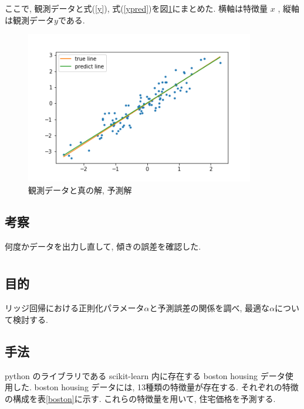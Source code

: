 \documentclass{jsarticle}
\begin{document}
ここで, 観測データと式(\ref{y}), 式(\ref{ypred})を図\ref{kaku}にまとめた. 横軸は特徴量 $x$ , 縦軸は観測データ$y$である. 


\begin{center}
\begin{figure}
\label{kaku}
\caption{観測データと真の解, 予測解}
\includegraphics[width=10cm]{prog/kaku.png}
\end{figure}
\end{center}



\subsection{考察}
何度かデータを出力し直して, 傾きの誤差を確認した. 





\section{}
\subsection{目的}
リッジ回帰における正則化パラメータ$\alpha$と予測誤差の関係を調べ, 最適な$\alpha$について検討する. 

\subsection{手法}
python のライブラリである scikit-learn 内に存在する boston housing データ使用した. 
boston housing データには, 13種類の特徴量が存在する.
それぞれの特徴の構成を表\ref{boston}に示す.
これらの特徴量を用いて, 住宅価格を予測する.
\end{document}

